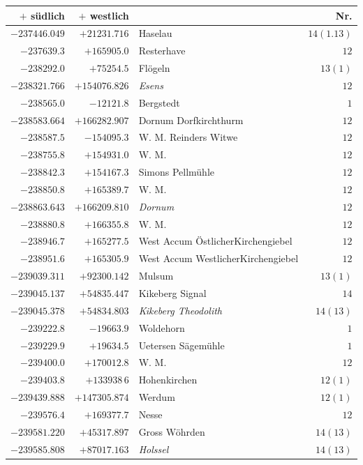 \clearpage{}%
\begin{center}\begingroup\fontsize{8}{9}\selectfont
\setlength{\tabcolsep}{4pt}
\begin{tabular}{r|r|p{170pt}|r}\hline
\(+\) südlich&\(+\) westlich&&Nr.\\\hline
\(-237446.049\)&\(+21231.716\)&Haselau&\(14(1.13)\)\\
\(-237639.3\)&\(+165905.0\)&Resterhave&\(12\)\\
\(-238292.0\)&\(+75254.5\)&Flögeln&\(13(1)\)\\
\(-238321.766\)&\(+154076.826\)&\textit{Esens}&\(12\)\\
\(-238565.0\)&\(-12121.8\)&Bergstedt&\(1\)\\
\(-238583.664\)&\(+166282.907\)&Dornum Dorfkirchthurm&\(12\)\\
\(-238587.5\)&\(-154095.3\)&W. M. Reinders Witwe&\(12\)\\
\(-238755.8\)&\(+154931.0\)&W. M.&\(12\)\\
\(-238842.3\)&\(+154167.3\)&Simons Pellmühle&\(12\)\\
\(-238850.8\)&\(+165389.7\)&W. M.&\(12\)\\
\(-238863.643\)&\(+166209.810\)&\textit{Dornum}&\(12\)\\
\(-238880.8\)&\(+166355.8\)&W. M.&\(12\)\\
\(-238946.7\)&\(+165277.5\)&West Accum ÖstlicherKirchengiebel&\(12\)\\
\(-238951.6\)&\(+165305.9\)&West Accum WestlicherKirchengiebel&\(12\)\\
\(-239039.311\)&\(+92300.142\)&Mulsum&\(13(1)\)\\
\(-239045.137\)&\(+54835.447\)&Kikeberg Signal&\(14\)\\
\(-239045.378\)&\(+54834.803\)&\textit{Kikeberg Theodolith}&\(14(13)\)\\
\(-239222.8\)&\(-19663.9\)&Woldehorn&\(1\)\\
\(-239229.9\)&\(+19634.5\)&Uetersen Sägemühle&\(1\)\\
\(-239400.0\)&\(+170012.8\)&W. M.&\(12\)\\
\(-239403.8\)&\(+133938\,6\)&Hohenkirchen&\(12(1)\)\\
\(-239439.888\)&\(+147305.874\)&Werdum&\(12(1)\)\\
\(-239576.4\)&\(+169377.7\)&Nesse&\(12\)\\
\(-239581.220\)&\(+45317.897\)&Gross Wöhrden&\(14(13)\)\\
\(-239585.808\)&\(+87017.163\)&\textit{Holssel}&\(14(13)\)\\

\end{tabular}
\end{center}
